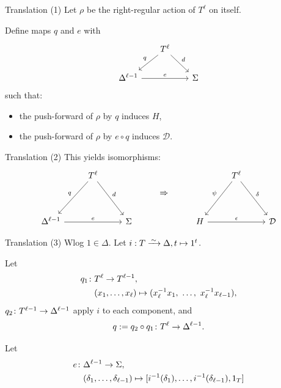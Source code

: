 \documentclass{beamer}
\theoremstyle{plain}
\theoremstyle{definition}
\begin{document}
\begin{frame}{Translation (1)}
Let $\rho$ be the right-regular action of $T ^ \ell$ on itself.

Define maps $q$ and $e$ with
\[
\begin{tikzcd}[column sep=scriptsize, ampersand replacement=\&]
    \&
    T ^ \ell
        \ar[ld, "q"']
        \ar[rd, "d"]
    \&
    \\
    \Delta ^ {\ell - 1}
        \ar[rr, "e"]
    \&
    \&
    \Sigma
\end{tikzcd}
\]
such that:
\begin{itemize}
\item the push-forward of $\rho$ by $q$ induces $H$,
\item the push-forward of $\rho$ by $e \circ q$ induces $\mathcal D$.
\end{itemize}
\end{frame}

\begin{frame}{Translation (2)}
This yields isomorphisms:
\[
\begin{tikzcd}[ampersand replacement=\&]
    \&
    T ^ \ell
        \ar[ld, "q"']
        \ar[rd, "d"]
    \&
    \&
    \raisebox{-2em}{$\Rightarrow$}
    \&
    \&
    T ^ \ell
        \ar[ld, "\psi"']
        \ar[rd, "\delta"]
    \&
    \\
    \Delta ^ {\ell - 1}
        \ar[rr, "e"]
    \&
    \&
    \Sigma
    \&
    \&
    H
        \ar[rr, "\epsilon"]
    \&
    \&
    \mathcal D
\end{tikzcd}
\]
\end{frame}


\begin{frame}{Translation (3)}
Wlog $1 \in \Delta$.
Let $i : T \iso \Delta, t \mapsto 1 ^ t$.

\pause
Let
\begin{align*}
    q_1 \colon &T ^ \ell \rightarrow T ^ {\ell - 1},
    \\
    &(x_1, \ldots, x_{\ell})
    \mapsto
    ( x_\ell ^ {-1} x_1,~
    \ldots,~
     x_\ell ^ {-1} x_{\ell - 1}),
\end{align*}
$
    q_2 \colon T ^ {\ell - 1} \rightarrow \Delta ^ {\ell - 1}
$
apply $i$ to each component, and
\[
    q := q_2 \circ q_1 \colon T ^ \ell \rightarrow \Delta ^ {\ell - 1}.
\]

\pause
Let
\begin{align*}
    e \colon &\Delta ^ {\ell - 1} \rightarrow \Sigma,
    \\
    &(\delta_1, \ldots, \delta_{\ell - 1})
    \mapsto
    [ i ^ {-1}(\delta_1), \ldots, i ^ {-1}(\delta_{\ell - 1}), 1_T ]
\end{align*}
\end{frame}
\end{document}
